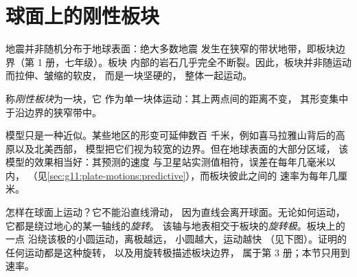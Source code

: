\section{球面上的刚性板块}

地震并非随机分布于地球表面：绝大多数地震
发生在狭窄的带状地带，即板块边界（第 1 册，七年级）。板块
内部的岩石几乎完全不断裂。因此，板块并非随运动而拉伸、皱缩的软皮，
而是一块坚硬的，
整体一起运动。

\begin{definition}[刚性板块]\label{def:g11:plate-motions:rigid-plate}
称\emph{刚性板块}为一块，它
作为单一块体运动：其上两点间的距离不变，
其形变集中于沿边界的狭窄带中。
\end{definition}

模型只是一种近似。某些地区的形变可延伸数百
千米，例如喜马拉雅山背后的高原以及北美西部，
模型把它们视为较宽的边界。但在地球表面的大部分区域，
该模型的效果相当好：其预测的速度
与卫星站实测值相符，误差在每年几毫米以内，
（见\cref{sec:g11:plate-motions:predictive}），而板块彼此之间的
速率为每年几厘米。

怎样在球面上运动？它不能沿直线滑动，
因为直线会离开球面。无论如何运动，
它都是绕过地心的某一轴线的\emph{旋转}。
该轴与地表相交于板块的\emph{旋转极}。板块上的一点
沿绕该极的小圆运动，离极越远，
小圆越大，运动越快
（见下图）。证明的任何运动都是这种旋转，
以及用旋转极描述板块边界，
属于第 3 册；本节只用到速率。

